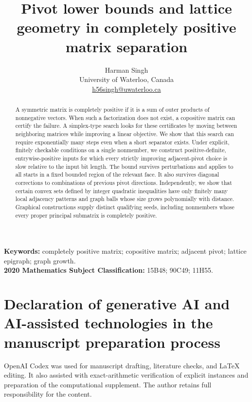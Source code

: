 \documentclass[11pt]{article}
\title{Pivot lower bounds and lattice geometry in completely positive matrix separation}
\author{Harman Singh\\[3pt]\normalsize University of Waterloo, Canada\\
\normalsize\href{mailto:h56singh@uwaterloo.ca}{h56singh@uwaterloo.ca}}
\date{}
\theoremstyle{remark}\newtheorem{remark}[theorem]{Remark}
\theoremstyle{definition}\newtheorem{definition}[theorem]{Definition}
\begin{document}
\maketitle
\begin{abstract}
A symmetric matrix is completely positive if it is a sum of outer products of nonnegative vectors. When such a factorization does not exist, a copositive matrix can certify the failure. A simplex-type search looks for these certificates by moving between neighboring matrices while improving a linear objective. We show that this search can require exponentially many steps even when a short separator exists. Under explicit, finitely checkable conditions on a single nonmember, we construct positive-definite, entrywise-positive inputs for which every strictly improving adjacent-pivot choice is slow relative to the input bit length. The bound survives perturbations and applies to all starts in a fixed bounded region of the relevant face. It also survives diagonal corrections to combinations of previous pivot directions. Independently, we show that certain convex sets defined by integer quadratic inequalities have only finitely many local adjacency patterns and graph balls whose size grows polynomially with distance. Graphical constructions supply distinct qualifying seeds, including nonmembers whose every proper principal submatrix is completely positive.
\end{abstract}
\noindent\textbf{Keywords:} completely positive matrix; copositive matrix; adjacent pivot; lattice epigraph; graph growth.\\
\textbf{2020 Mathematics Subject Classification:} 15B48; 90C49; 11H55.






\appendix

\section*{Declaration of generative AI and AI-assisted technologies in the manuscript preparation process}
OpenAI Codex was used for manuscript drafting, literature checks, and LaTeX editing. It also assisted with exact-arithmetic verification of explicit instances and preparation of the computational supplement. The author retains full responsibility for the content.

\end{document}
